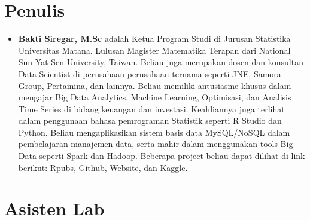 \documentclass[
]{book}
\providecommand{\tightlist}{%
  \setlength{\itemsep}{0pt}\setlength{\parskip}{0pt}}
\begin{document}
\hypertarget{penulis}{%
\section*{Penulis}\label{penulis}}

\begin{itemize}
\tightlist
\item
  \textbf{Bakti Siregar, M.Sc} adalah Ketua Program Studi di Jurusan Statistika Universitas Matana. Lulusan Magister Matematika Terapan dari National Sun Yat Sen University, Taiwan. Beliau juga merupakan dosen dan konsultan Data Scientist di perusahaan-perusahaan ternama seperti \href{https://www.jne.co.id/id/beranda}{JNE}, \href{https://www.samoragroup.co.id/home/en}{Samora Group}, \href{https://www.pertamina.com/}{Pertamina}, dan lainnya. Beliau memiliki antusiasme khusus dalam mengajar Big Data Analytics, Machine Learning, Optimisasi, dan Analisis Time Series di bidang keuangan dan investasi. Keahliannya juga terlihat dalam penggunaan bahasa pemrograman Statistik seperti R Studio dan Python. Beliau mengaplikasikan sistem basis data MySQL/NoSQL dalam pembelajaran manajemen data, serta mahir dalam menggunakan tools Big Data seperti Spark dan Hadoop. Beberapa project beliau dapat dilihat di link berikut: \href{https://rpubs.com/dsciencelabs}{Rpubs}, \href{https://github.com/dsciencelabs}{Github}, \href{https://dsciencelabs.github.io/web/index.html}{Website}, dan \href{https://www.kaggle.com/baktisiregar/code}{Kaggle}.
\end{itemize}

\hypertarget{asisten-lab}{%
\section*{Asisten Lab}\label{asisten-lab}}
\end{document}
